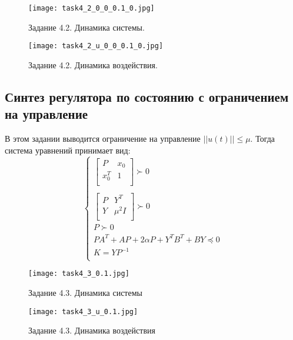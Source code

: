 \begin{figure}[]
    \centering
    \texttt{[image: task4\_2\_0\_0\_0.1\_0.jpg]}
    \caption{Задание 4.2. Динамика системы.}
    \label{fig:task4_2_1}
\end{figure}
\begin{figure}[]
    \centering
    \texttt{[image: task4\_2\_u\_0\_0\_0.1\_0.jpg]}
    \caption{Задание 4.2. Динамика воздействия.}
    \label{fig:task4_2_2}
\end{figure}


\subsection{Синтез регулятора по состоянию с ограничением на управление}

В этом задании выводится ограничение на управление \(||u(t)|| \leq \mu\). Тогда система уравнений принимает вид: 
\[
        \begin{cases}
                \begin{bmatrix}
                    P &  x_0\\
                    x_0^T &  1 \\
                \end{bmatrix} \succ 0 \\
                \\
                \begin{bmatrix}
                    P &  Y^T\\
                    Y &  \mu^2I \\
                \end{bmatrix} \succ 0 \\
                P \succ 0 \\
                PA^T + AP + 2 \alpha P + Y^T B^T + BY \preccurlyeq 0  \\
                K = YP^{-1}\\
        \end{cases} 
\]
\begin{figure}[]
    \centering
    \texttt{[image: task4\_3\_0.1.jpg]}
    \caption{Задание 4.3. Динамика системы}
    \label{fig:task4_3_0.1}
\end{figure}
\begin{figure}[]
    \centering
    \texttt{[image: task4\_3\_u\_0.1.jpg]}
    \caption{Задание 4.3. Динамика воздействия}
    \label{fig:task4_3_u_0.1}
\end{figure}


